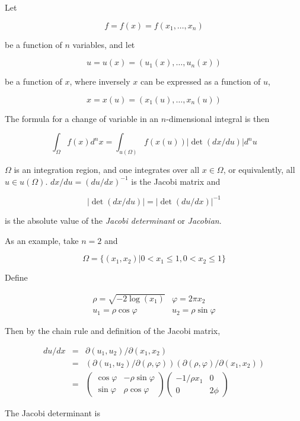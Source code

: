 \documentclass{article}
\begin{document}
Let

$$ f=f(x) = f(x_1,\ldots,x_n) $$

be a function of $n$ variables, and let

$$ u = u(x) = (u_1(x),\ldots,u_n(x)) $$

be a function of $x$, where inversely $x$ can be expressed as a function of $u$,

$$ x = x(u) = (x_1(u), \ldots,x_n(u)) $$

The formula for a change of variable in an $n$-dimensional integral is then

$$ \int_\Omega f(x)d^nx = \int_{u(\Omega)} f(x(u))|\det(dx/du)|d^nu  $$

$\Omega$ is an integration region, and one integrates over all $x \in \Omega$, or equivalently, all $u \in u(\Omega)$. $dx/du = (du/dx)^{-1}$ is the Jacobi matrix and

$$ | \det(dx/du)| = |\det(du/dx)|^{-1} $$

is the absolute value of the \emph{Jacobi determinant} or \emph{Jacobian}.

As an example, take $n=2$ and

$$ \Omega = \{(x_1,x_2) | 0<x_1 \le 1, 0 < x_2 \le 1 \} $$

Define

$$ \begin{array}{cc}\rho = \sqrt{-2 \log(x_1)} & \varphi = 2\pi x_2 \\
    u_1 = \rho \cos \varphi & u_2 = \rho \sin \varphi \end{array} $$

Then by the chain rule and definition of the Jacobi matrix,

\begin{eqnarray*}
 du/dx & = & \partial(u_1,u_2) / \partial(x_1,x_2) \\
       & = & (\partial(u_1,u_2)/\partial(\rho,\varphi))(\partial(\rho,\varphi)/\partial(x_1,x_2)) \\
       & = & \begin{pmatrix}\cos \varphi & - \rho \sin \varphi \\ \sin \varphi & \rho \cos \varphi \end{pmatrix} \begin{pmatrix}-1 / \rho x_1 & 0 \\ 0 & 2 \phi \end{pmatrix} 
\end{eqnarray*}

The Jacobi determinant is
\end{document}
